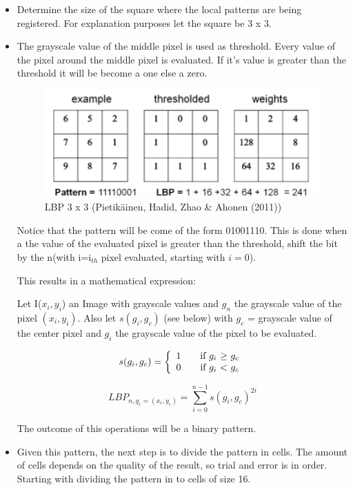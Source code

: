 \documentclass[a4paper]{article}
\begin{document}
\begin{itemize}
\item Determine the size of the square where the local patterns are being
registered. For explanation purposes let the square be 3 x 3. \\
\item The grayscale value of the middle pixel is used as threshold. Every
value of the pixel around the middle pixel is evaluated. If it's value is
greater than the threshold it will be become a one else a zero.

\begin{figure}[H]
\center
\includegraphics[scale=0.5]{lbp.png}
\caption{LBP 3 x 3 (Pietik\"ainen, Hadid, Zhao \& Ahonen (2011))}
\end{figure}

Notice that the pattern will be come of the form 01001110. This is done when a
the value of the evaluated pixel is greater than the threshold, shift the bit
by the n(with i=i$_{th}$ pixel evaluated, starting with $i=0$).

This results in a mathematical expression:

Let I($x_i, y_i$) an Image with grayscale values and $g_n$ the grayscale value
of the pixel $(x_i, y_i)$. Also let $s(g_i, g_c)$ (see below) with $g_c$ =
grayscale value of the center pixel and $g_i$ the grayscale value of the pixel
to be evaluated.

$$
  s(g_i, g_c) = \left\{
  \begin{array}{l l}
    1 & \quad \text{if $g_i$ $\geq$ $g_c$}\\
    0 & \quad \text{if $g_i$ $<$ $g_c$}\\
  \end{array} \right.
$$

$$LBP_{n, g_c = (x_c, y_c)} = \sum\limits_{i=0}^{n-1} s(g_i, g_c)^{2i} $$

The outcome of this operations will be a binary pattern.

\item Given this pattern, the next step is to divide the pattern in cells. The
amount of cells depends on the quality of the result, so trial and error is in
order. Starting with dividing the pattern in to cells of size 16.


\end{itemize}
\end{document}
